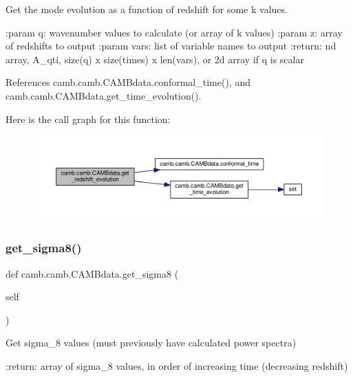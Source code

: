 \begin{DoxyVerb}Get the mode evolution as a function of redshift for some k values.

:param q: wavenumber values to calculate (or array of k values)
:param z: array of redshifts to output
:param vars: list of variable names to output
:return: nd array, A_{qti}, size(q) x size(times) x len(vars), or 2d array if q is scalar
\end{DoxyVerb}
 

References camb.\+camb.\+C\+A\+M\+Bdata.\+conformal\+\_\+time(), and camb.\+camb.\+C\+A\+M\+Bdata.\+get\+\_\+time\+\_\+evolution().

Here is the call graph for this function\+:
\nopagebreak
\begin{figure}[H]
\begin{center}
\leavevmode
\includegraphics[width=350pt]{classcamb_1_1camb_1_1CAMBdata_a429985d3103382ee2faaa702bd125ff8_cgraph}
\end{center}
\end{figure}
\mbox{\label{classcamb_1_1camb_1_1CAMBdata_a1891baad8b4e53b2a1f2d136ddbef5e2}} 
\subsubsection{\texorpdfstring{get\+\_\+sigma8()}{get\_sigma8()}}
{\footnotesize\ttfamily def camb.\+camb.\+C\+A\+M\+Bdata.\+get\+\_\+sigma8 (\begin{DoxyParamCaption}\item[{}]{self }\end{DoxyParamCaption})}

\begin{DoxyVerb}Get sigma_8 values (must previously have calculated power spectra)

:return: array of sigma_8 values, in order of increasing time (decreasing redshift)
\end{DoxyVerb}
 

